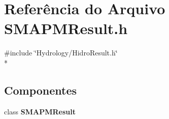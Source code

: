 \section{Referência do Arquivo S\+M\+A\+P\+M\+Result.\+h}
\label{_s_m_a_p_m_result_8h}
{\ttfamily \#include \char`\"{}Hydrology/\+Hidro\+Result.\+h\char`\"{}}\\*
\subsection*{Componentes}
\begin{DoxyCompactItemize}
\item 
class {\bf S\+M\+A\+P\+M\+Result}
\end{DoxyCompactItemize}
